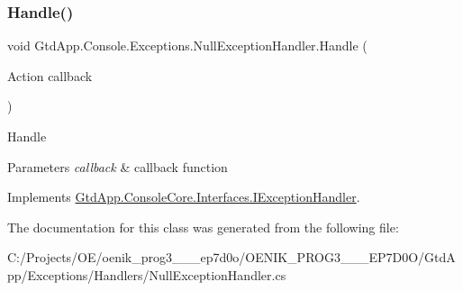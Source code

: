 \subsubsection{\texorpdfstring{Handle()}{Handle()}}
{\footnotesize\ttfamily void Gtd\+App.\+Console.\+Exceptions.\+Null\+Exception\+Handler.\+Handle (\begin{DoxyParamCaption}\item[{Action}]{callback }\end{DoxyParamCaption})}



Handle 


\begin{DoxyParams}{Parameters}
{\em callback} & callback function\\
\hline
\end{DoxyParams}


Implements \mbox{\hyperlink{interface_gtd_app_1_1_console_core_1_1_interfaces_1_1_i_exception_handler_a4d0af5418cd0b240e5e1e437e2b571d9}{Gtd\+App.\+Console\+Core.\+Interfaces.\+I\+Exception\+Handler}}.



The documentation for this class was generated from the following file\+:\begin{DoxyCompactItemize}
\item 
C\+:/\+Projects/\+O\+E/oenik\+\_\+prog3\+\_\+\_\+\_\+ep7d0o/\+O\+E\+N\+I\+K\+\_\+\+P\+R\+O\+G3\+\_\+\_\+\_\+\+E\+P7\+D0\+O/\+Gtd\+App/\+Exceptions/\+Handlers/Null\+Exception\+Handler.\+cs\end{DoxyCompactItemize}
